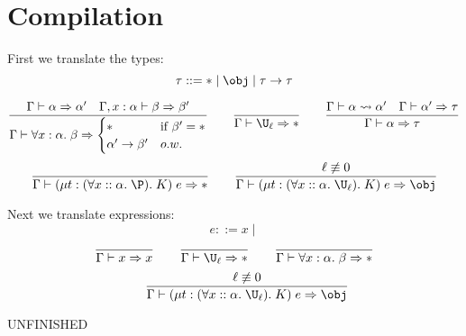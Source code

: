 \section{Compilation}
First we translate the types:
$$\tau::=\ast\mid \obj\mid \tau\to\tau$$

$$\frac{\Gamma\vdash\alpha\Rightarrow \alpha'\quad \Gamma,x:\alpha\vdash \beta\Rightarrow \beta'}
{\Gamma\vdash\forall x:\alpha.\;\beta\Rightarrow
\begin{cases}
\ast&\mbox{if }\beta'=\ast\\
\alpha'\to\beta'&o.w.
\end{cases}}\qquad
\frac{}{\Gamma\vdash\U_\ell\Rightarrow \ast}\qquad
\frac{\Gamma\vdash\alpha\rightsquigarrow \alpha'\quad \Gamma\vdash \alpha'\Rightarrow \tau}
{\Gamma\vdash\alpha\Rightarrow\tau}$$
$$\frac{}{\Gamma\vdash(\mu t:(\forall x::\alpha.\;\P).\;K)\;e\Rightarrow \ast}\qquad
\frac{\ell\not\equiv 0}{\Gamma\vdash(\mu t:(\forall x::\alpha.\;\U_\ell).\;K)\;e\Rightarrow \obj}$$

Next we translate expressions:
$$e::=x\mid $$
$$\frac{}{\Gamma\vdash x\Rightarrow x}\qquad
\frac{}{\Gamma\vdash\U_\ell\Rightarrow \ast}\qquad
\frac{}{\Gamma\vdash\forall x:\alpha.\;\beta\Rightarrow \ast}$$
$$\qquad
\frac{\ell\not\equiv 0}{\Gamma\vdash(\mu t:(\forall x::\alpha.\;\U_\ell).\;K)\;e\Rightarrow \obj}$$

UNFINISHED
